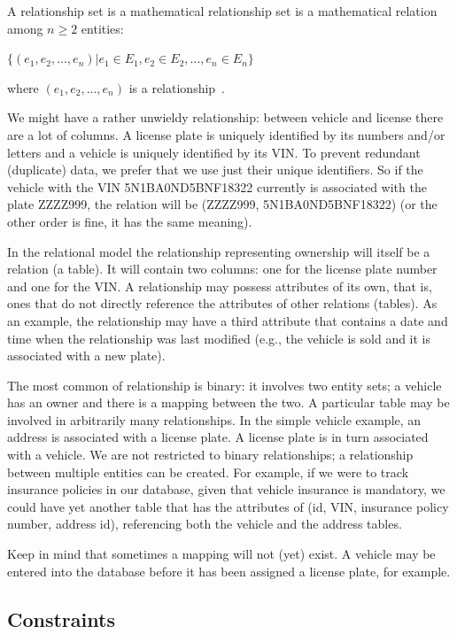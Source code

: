 A relationship set is a mathematical relationship set is a mathematical relation among $n \geq 2$ entities:

\begin{center}
 $\{(e_{1}, e_{2}, ..., e_{n}) | e_{1} \in E_{1}, e_{2} \in E_{2}, ..., e_{n} \in E_{n}\}$
\end{center}

where $(e_{1}, e_{2}, ..., e_{n})$ is a relationship~\cite{dsc}. 

We might have a rather unwieldy relationship: between vehicle and license there are a lot of columns. A license plate is uniquely identified by its numbers and/or letters and a vehicle is uniquely identified by its VIN. To prevent redundant (duplicate) data, we prefer that we use just their unique identifiers. So if the vehicle with the VIN 5N1BA0ND5BNF18322 currently is associated with the plate ZZZZ999, the relation will be (ZZZZ999, 5N1BA0ND5BNF18322) (or the other order is fine, it has the same meaning).

In the relational model the relationship representing ownership will itself be a relation (a table). It will contain two columns: one for the license plate number and one for the VIN. A relationship may possess attributes of its own, that is, ones that do not directly reference the attributes of other relations (tables). As an example, the relationship may have a third attribute that contains a date and time when the relationship was last modified (e.g., the vehicle is sold and it is associated with a new plate).

The most common of relationship is binary: it involves two entity sets; a vehicle has an owner and there is a mapping between the two. A particular table may be involved in arbitrarily many relationships. In the simple vehicle example, an address is associated with a license plate. A license plate is in turn associated with a vehicle. We are not restricted to binary relationships; a relationship between multiple entities can be created. For example, if we were to track insurance policies in our database, given that vehicle insurance is mandatory, we could have yet another table that has the attributes of (id, VIN, insurance policy number, address id), referencing both the vehicle and the address tables. 

Keep in mind that sometimes a mapping will not (yet) exist. A vehicle may be entered into the database before it has been assigned a license plate, for example. 

\subsection*{Constraints}

